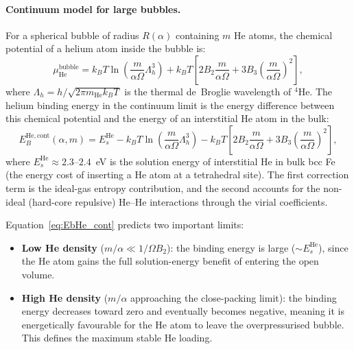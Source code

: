 \documentclass[pdflatex,sn-basic]{sn-jnl} %
\begin{document}
\paragraph{Continuum model for large bubbles.}
For a spherical bubble of radius $R(\alpha)$ containing $m$ He atoms, the
chemical potential of a helium atom inside the bubble is:
\begin{equation}\label{eq:mu_He}
    \mu_{\mathrm{He}}^{\mathrm{bubble}} = k_BT\ln\!\left(\frac{m}{\alpha\Omega}\Lambda_h^3\right)
    + k_BT\!\left[2B_2\frac{m}{\alpha\Omega} + 3B_3\!\left(\frac{m}{\alpha\Omega}\right)^{\!2}\right],
\end{equation}
where $\Lambda_h = h/\sqrt{2\pi m_{\mathrm{He}} k_BT}$ is the thermal de~Broglie
wavelength of $^4$He. The helium binding energy in the continuum limit is the
energy difference between this chemical potential and the energy of an
interstitial He atom in the bulk:
\begin{equation}\label{eq:EbHe_cont}
    E_B^{\mathrm{He,cont}}(\alpha,m) = E_s^{\mathrm{He}}
    - k_BT\ln\!\left(\frac{m}{\alpha\Omega}\Lambda_h^3\right)
    - k_BT\!\left[2B_2\frac{m}{\alpha\Omega}
                  + 3B_3\!\left(\frac{m}{\alpha\Omega}\right)^{\!2}\right],
\end{equation}
where $E_s^{\mathrm{He}} \approx 2.3$--$2.4$~eV is the solution energy of
interstitial He in bulk bcc Fe (the energy cost of inserting a He atom at a
tetrahedral site). The first correction term is the ideal-gas entropy
contribution, and the second accounts for the non-ideal (hard-core repulsive)
He--He interactions through the virial coefficients.

Equation~\eqref{eq:EbHe_cont} predicts two important limits:
\begin{itemize}
    \item \textbf{Low He density} ($m/\alpha \ll 1/\Omega B_2$): the binding
    energy is large ($\sim E_s^{\mathrm{He}}$), since the He atom gains the
    full solution-energy benefit of entering the open volume.
    \item \textbf{High He density} ($m/\alpha$ approaching the close-packing
    limit): the binding energy decreases toward zero and eventually becomes
    negative, meaning it is energetically favourable for the He atom to leave
    the overpressurised bubble. This defines the maximum stable He loading.
\end{itemize}
\end{document}
